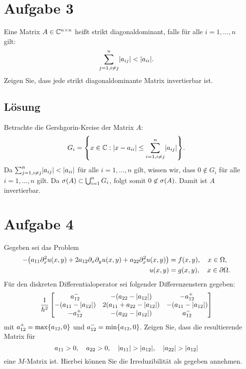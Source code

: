 \documentclass{exercise}
\begin{document}
    \section*{Aufgabe 3}

    \begin{problem}
        Eine Matrix \(A \in \mathbb{C}^{n \times n}\) heißt strikt diagonaldominant, falls für alle \(i = 1, \ldots, n\) gilt:
        \[
            \sum_{j = 1, i \ne j}^n\absolute*{a_{ij}} < \absolute*{a_{ii}}.
        \]
        Zeigen Sie, dass jede strikt diagonaldominante Matrix invertierbar ist.
    \end{problem}

    \subsection*{Lösung}
    Betrachte die Gershgorin-Kreise der Matrix \(A\):
    \[
        G_i = \braces*{x \in \C : \absolute*{x - a_{ii}} \le \sum_{i = 1, i \ne j}^n\absolute*{a_{ij}}}.
    \]
    Da \(\sum_{j = 1, i \ne j}^n \absolute*{a_{ij}} < \absolute*{a_{ii}}\) für alle \(i = 1, \ldots, n\) gilt, wissen wir, dass \(0 \not\in G_i\) für alle \(i = 1, \ldots, n\) gilt.
    Da \(\sigma\parentheses*{A} \subset \bigcup_{i = 1}^n G_i\), folgt somit \(0 \not\in \sigma\parentheses*{A}\).
    Damit ist \(A\) invertierbar.


    \section*{Aufgabe 4}

    \begin{problem}
        Gegeben sei das Problem
        \begin{align*}
            -\parentheses*{a_{11}\partial_x^2 u\parentheses*{x, y} + 2a_{12}\partial_x \partial_y u\parentheses*{x, y} + a_{22}\partial_x^2 u\parentheses*{x, y}} &= f\parentheses*{x, y}, \quad x \in \Omega,\\
            u\parentheses*{x, y} &= g\parentheses*{x, y}, \quad x \in \partial\Omega.
        \end{align*}
        Für den diskreten Differentialoperator sei folgender Differenzenstern gegeben:
        \[
            \frac{1}{h^2}\begin{bmatrix}
                a_{12}^- & -\parentheses*{a_{22} - \absolute*{a_{12}}} & -a_{12}^+\\
                -\parentheses*{a_{11} - \absolute*{a_{12}}} & 2\parentheses*{a_{11} + a_{22} - \absolute*{a_{12}}} & -\parentheses*{a_{11} - \absolute*{a_{12}}}\\
                -a_{12}^+ & -\parentheses*{a_{22} - \absolute*{a_{12}}} & a_{12}^-
            \end{bmatrix}
        \]
        mit \(a_{12}^+ = \max\braces*{a_{12}, 0}\) und \(a_{12}^- = \min\braces*{a_{12}, 0}\).
        Zeigen Sie, dass die resultierende Matrix für
        \[
            a_{11} > 0, \quad a_{22} > 0, \quad \absolute*{a_{11}} > \absolute*{a_{12}}, \quad \absolute*{a_{22}} > \absolute*{a_{12}}
        \]
        eine \(M\)-Matrix ist.
        Hierbei können Sie die Irreduzibilität als gegeben annehmen.
    \end{problem}
\end{document}
